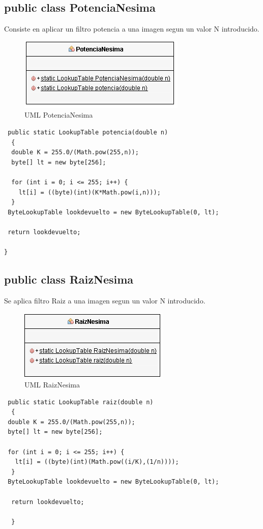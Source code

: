 \subsection*{public class PotenciaNesima}
 Consiste en aplicar un filtro potencia a una imagen segun un valor N introducido.
 
\begin{figure}[H]
  \centering
    \includegraphics[scale=0.75]{images/potencia}
  \caption{UML PotenciaNesima}
  \label{UML PotenciaNesima}
\end{figure}

 \begin{lstlisting}
 public static LookupTable potencia(double n)
  {
  double K = 255.0/(Math.pow(255,n));
  byte[] lt = new byte[256];
    
  for (int i = 0; i <= 255; i++) {
    lt[i] = ((byte)(int)(K*Math.pow(i,n)));
  }
 ByteLookupTable lookdevuelto = new ByteLookupTable(0, lt);
    
 return lookdevuelto;
    
}
\end{lstlisting}

\subsection*{public class RaizNesima}
Se aplica filtro Raiz a una imagen segun un valor N introducido.

\begin{figure}[H]
  \centering
    \includegraphics[scale=0.75]{images/raiz}
  \caption{UML RaizNesima}
  \label{UML RaizNesima}
\end{figure}


\begin{lstlisting}
 public static LookupTable raiz(double n)
  {
 double K = 255.0/(Math.pow(255,n));
 byte[] lt = new byte[256];
    
 for (int i = 0; i <= 255; i++) {
   lt[i] = ((byte)(int)(Math.pow((i/K),(1/n))));
  }
 ByteLookupTable lookdevuelto = new ByteLookupTable(0, lt);
    
  return lookdevuelto;
    
  }
\end{lstlisting}

